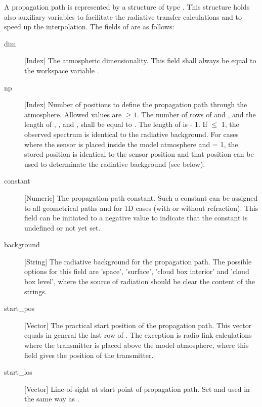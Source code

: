 A propagation path is represented by a structure of type
. This structure holds also auxiliary variables to
facilitate the radiative transfer calculations and to speed up the
interpolation. The fields of  are as follows:

\begin{description}

  \item[dim] [Index] The atmospheric dimensionality. This field shall always 
     be equal to the workspace variable .
     
   \item[np] [Index] Number of positions to define the propagation path through
     the atmosphere. Allowed values are $\geq 1$. The number of rows of
      and , and the length of ,
     ,  and , shall be
     equal to . The length of  is
      - 1. If  $\leq$ 1, the observed spectrum is
     identical to the radiative background. For cases where the sensor is
     placed inside the model atmosphere and  = 1, the stored
     position is identical to the sensor position and that position can be used
     to determinate the radiative background (see below).

   \item[constant] [Numeric] The propagation path constant. Such a
     constant can be assigned to all geometrical paths and for 1D
     cases (with or without refraction). This field can be
     initiated to a negative value to indicate that the constant is
     undefined or not yet set. 

   \item[background] [String] The radiative background for the propagation
     path. The possible options for this field are 'space', 'surface', 'cloud
     box interior' and 'cloud box level', where the source of radiation
     should be clear the content of the strings.
     
   \item[start\_pos] [Vector] The practical start position of the propagation
     path. This vector equals in general the last row of . The
     exception is radio link calculations where the transmitter is placed above
     the model atmosphere, where this field gives the position of the
     transmitter.

   \item[start\_los] [Vector] Line-of-sight at start point of propagation
     path. Set and used in the same way as .


\end{description}

